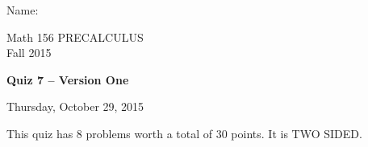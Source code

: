 \documentclass[11pt]{article}
\begin{document}

{\huge{Name:{\underline{\hspace{4in}}}}}
\vfill

\begin{center}
\vspace{1in}

\huge{Math 156 PRECALCULUS \\
Fall 2015}

\vfill

\huge{\bf{Quiz 7 -- Version One}}\\

\vspace{0.5in}

\large{Thursday, October 29, 2015}\\

\vfill

This quiz has 8 problems worth a total of 30 points. It is TWO SIDED. 
\vfill
\end{center}


\vfill
\end{document}
